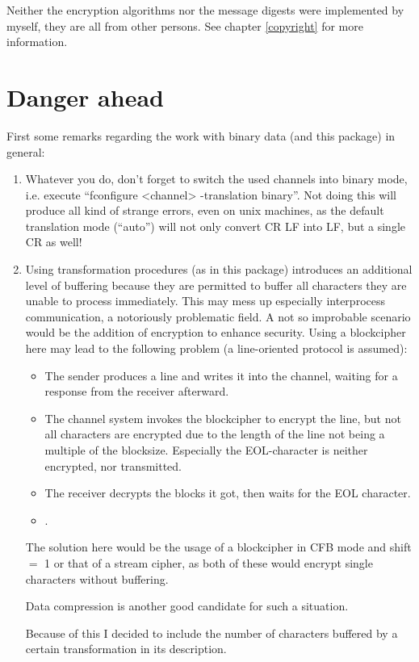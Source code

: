 \documentclass {report}
\begin{document}
Neither the encryption algorithms nor the message digests were
implemented by myself, they are all from other persons. See chapter
\ref {copyright} for more information.


\chapter {Danger ahead}

First some remarks regarding the work with binary data (and this
package) in general:

\begin {enumerate}
\item	Whatever you do, don't forget to switch the used channels into
	binary mode, i.e. execute ``fconfigure <channel> -translation
	binary''. Not doing this will produce all kind of strange
	errors, even on unix machines, as the default translation mode
	(``auto'') will not only convert CR LF into LF, but a single
	CR as well!

\item	Using transformation procedures (as in this package)
	introduces an additional level of buffering because they are
	permitted to buffer all characters they are unable to process
	immediately. This may mess up especially
	interprocess communication, a notoriously problematic field. A
	not so improbable scenario would be the addition of encryption
	to enhance security. Using a blockcipher here may lead to the
	following problem (a line-oriented protocol is assumed):

	\begin {itemize}
	\item	The sender produces a line and writes it into the channel,
		waiting for a response from the receiver afterward.
	\item	The channel system invokes the blockcipher to encrypt
		the line, but not all characters are encrypted due to
		the length of the line not being a multiple of the
		blocksize. Especially the EOL-character is neither
		encrypted, nor transmitted.
	\item	The receiver decrypts the blocks it got, then waits
		for the EOL character.
	\item	{}.
	\end   {itemize}

	The solution here would be the usage of a blockcipher in CFB
	mode and shift $=$ 1 or that of a stream cipher, as both of these
	would encrypt single characters without buffering.

	Data compression is another good candidate for such a situation.

	Because of this I decided to include the number of characters
	buffered by a certain transformation in its description.

\end   {enumerate}
\end{document}
